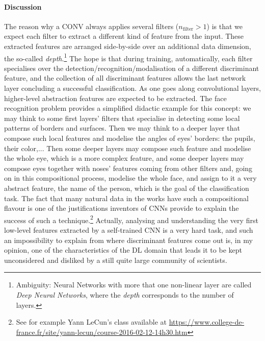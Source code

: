 \paragraph*{Discussion}
The reason why a CONV always applies several filters (\ie $n_{\text{filter}}>1$) is
that we expect each filter to extract a different kind of feature from
the input. These extracted features are arranged
side-by-side over an additional data dimension, the so-called
\emph{depth}.\footnote{Ambiguity: Neural Networks with more that one non-linear layer are called
\emph{Deep Neural Networks}, where the \emph{depth} corresponds to the number of
layers.} The hope is that during training, automatically, each filter specialises over the detection/recognition/modalisation of a different discriminant feature, and the collection of all discriminant features allows the last network layer concluding a successful classification.  As one goes along convolutional layers, higher-level abstraction
features are expected to be extracted.  The face recognition problem provides a simplified didactic example for this concept: we may think to some first layers' filters that specialise in detecting some local patterns of borders and surfaces. Then we may think to a deeper layer that compose such local features and modelise the angles of eyes' borders: the pupils, their color,... Then some deeper layers may compose such feature and modelise  the whole eye, which is a more complex feature, and some deeper layers may compose eyes together with noses' features coming from other filters and, going on in this compositional process, modelise the whole face, and assign to it a very abstract feature, \ie the name of the person, which is the goal of the classification task. The fact that many natural data in the works have such a compositional flavour is one of the justifications inventors of CNNs provide to explain the success of such a technique.\footnote{See for example Yann LeCun's class available at \url{https://www.college-de-france.fr/site/yann-lecun/course-2016-02-12-14h30.htm}}  Actually, analysing and understanding the very first low-level features extracted by a self-trained CNN is a very hard task, and such an impossibility to explain from where discriminant features come out is, in my opinion, one of the characteristics of the DL domain that leads it to be kept unconsidered and disliked by a still quite large community of scientists. 

